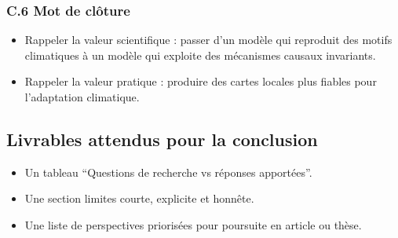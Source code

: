 \documentclass[12pt,a4paper]{article}
\begin{document}
\subsubsection*{C.6 Mot de cl\^oture}
\begin{itemize}
    \item Rappeler la valeur scientifique : passer d'un mod\`ele qui reproduit des motifs climatiques \`a un mod\`ele qui exploite des m\'ecanismes causaux invariants.
    \item Rappeler la valeur pratique : produire des cartes locales plus fiables pour l'adaptation climatique.
\end{itemize}

\subsection*{Livrables attendus pour la conclusion}
\begin{itemize}
    \item Un tableau ``Questions de recherche vs r\'eponses apport\'ees''.
    \item Une section limites courte, explicite et honn\^ete.
    \item Une liste de perspectives prioris\'ees pour poursuite en article ou th\`ese.
\end{itemize}
\end{document}
